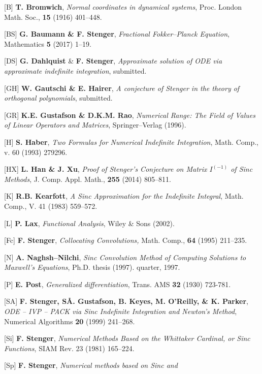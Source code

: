 \documentclass[11pt]{article}
\begin{document}
\begin{description}
  \begin{sloppypar}
\item{[B]}  {\bf T. Bromwich}, {\em Normal coordinates in dynamical 
  systems}, Proc. London Math. Soc., {\bf 15} (1916) 401--448. 
\item{[BS]} {\bf G. Baumann \& F. Stenger}, {\em Fractional Fokker--Planck
  Equation}, Mathematics {\bf 5} (2017) 1--19.
\item{[DS]}  {\bf G. Dahlquist} \& {\bf F. Stenger},  {\em
  Approximate solution of ODE via approximate indefinite integration},
  submitted.
\item{[GH]} {\bf W. Gautschi \& E. Hairer}, {\em A conjecture of Stenger in
  the theory of orthogonal polynomials}, submitted.
\item{[GR]} {\bf K.E. Gustafson \& D.K.M. Rao}, {\em Numerical Range:
     The Field of Values of Linear Operators and Matrices},
     Springer--Verlag (1996).  
\item {[H]} {\bf S. Haber}, {\em Two Formulas for Numerical Indefinite
  Integration}, Math. Comp., v.  60 (1993) 279­296.
\item{[HX]}  {\bf L. Han \& J. Xu}, {\em Proof of Stenger's Conjecture on Matrix
  $I^{(-1)}$ of Sinc Methods}, J. Comp. Appl. Math., {\bf 255} (2014)
  805--811.
 \item{[K]} {\bf R.B. Kearfott}, {\em A Sinc Approximation for the
   Indefinite Integral}, Math. Comp., V. 41 (1983) 559--572.
\item{[L]}  {\bf P. Lax}, {\em Functional Analysis}, Wiley \& Sons (2002).
\item{[Fc]} {\bf F. Stenger}, {\em Collocating Convolutions,}  Math. Comp.,
  {\bf 64} (1995) 211--235.
\item{[N]} {\bf A. Naghsh--Nilchi}, {\em Sinc Convolution Method of Computing
      Solutions to Maxwell's Equations}, Ph.D. thesis (1997).
  quarter, 1997.
\item{[P]} {\bf E. Post}, {\em Generalized differentiation},
  Trans. AMS {\bf 32} (1930) 723-781.
\item {[SA]} {\bf F. Stenger, S\AA. Gustafson, B. Keyes,
  M. O'Reilly, \& K.  Parker}, {\em ODE -- IVP -- PACK via Sinc
  Indefinite Integration and Newton's Method}, Numerical Algorithms
  {\bf 20} (1999) 241--268.
\item{[Si]} {\bf F. Stenger}, {\em Numerical Methods Based on the Whittaker
  Cardinal, or Sinc Functions}, SIAM Rev. 23 (1981) 165--224.
\item{[Sp]} {\bf F. Stenger}, {\em Numerical methods based on Sinc and
}
\end{sloppypar}
\end{description}
\end{document}
